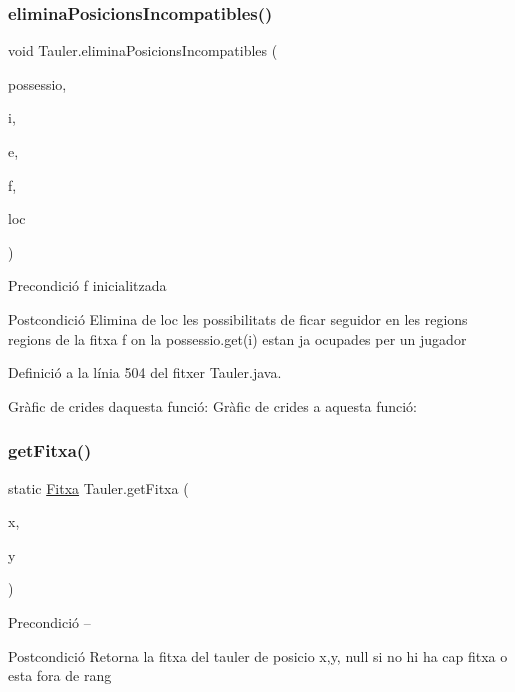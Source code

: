 \subsubsection{\texorpdfstring{elimina\+Posicions\+Incompatibles()}{eliminaPosicionsIncompatibles()}}
{\footnotesize\ttfamily void Tauler.\+elimina\+Posicions\+Incompatibles (\begin{DoxyParamCaption}\item[{Array\+List$<$ \mbox{\hyperlink{class_possessio}{Possessio}} $>$}]{possessio,  }\item[{int}]{i,  }\item[{char}]{e,  }\item[{\mbox{\hyperlink{class_fitxa}{Fitxa}}}]{f,  }\item[{Array\+List$<$ Character $>$}]{loc }\end{DoxyParamCaption})\hspace{0.3cm}{\ttfamily [private]}}

\begin{DoxyPrecond}{Precondició}
f inicialitzada 
\end{DoxyPrecond}
\begin{DoxyPostcond}{Postcondició}
Elimina de loc les possibilitats de ficar seguidor en les regions regions de la fitxa f on la possessio.\+get(i) estan ja ocupades per un jugador 
\end{DoxyPostcond}


Definició a la línia 504 del fitxer Tauler.\+java.

Gràfic de crides d\textquotesingle{}aquesta funció\+:
Gràfic de crides a aquesta funció\+:
\mbox{\label{class_tauler_aaed75eb94f6022165789d1941aac603c}} 
\subsubsection{\texorpdfstring{get\+Fitxa()}{getFitxa()}}
{\footnotesize\ttfamily static \mbox{\hyperlink{class_fitxa}{Fitxa}} Tauler.\+get\+Fitxa (\begin{DoxyParamCaption}\item[{int}]{x,  }\item[{int}]{y }\end{DoxyParamCaption})\hspace{0.3cm}{\ttfamily [static]}}

\begin{DoxyPrecond}{Precondició}
-- 
\end{DoxyPrecond}
\begin{DoxyPostcond}{Postcondició}
Retorna la fitxa del tauler de posicio x,y, null si no hi ha cap fitxa o esta fora de rang 
\end{DoxyPostcond}



